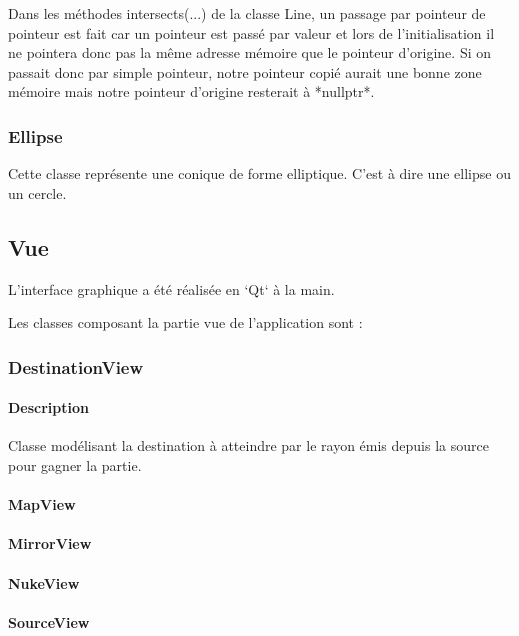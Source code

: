 \documentclass[]{article}
\begin{document}
Dans les méthodes intersects(...) de la classe Line, un passage
par pointeur de pointeur est fait car un pointeur est passé par 
valeur et lors de l'initialisation il ne pointera donc pas la même
adresse mémoire que le pointeur d'origine.
Si on passait donc par simple pointeur, notre pointeur copié
aurait une bonne zone mémoire mais notre pointeur d'origine
resterait à *nullptr*.

\subsubsection{Ellipse}


Cette classe représente une conique de forme elliptique.
C'est à dire une ellipse ou un cercle.


\subsection{Vue}


L’interface graphique a été réalisée en `Qt` à la main.

Les classes composant la partie vue de l’application sont :

\subsubsection{DestinationView}

\paragraph{Description}


Classe modélisant la destination à atteindre par le rayon émis depuis la source pour gagner la partie.

\paragraph{MapView}

\paragraph{MirrorView}

\paragraph{NukeView}

\paragraph{SourceView}
\end{document}
